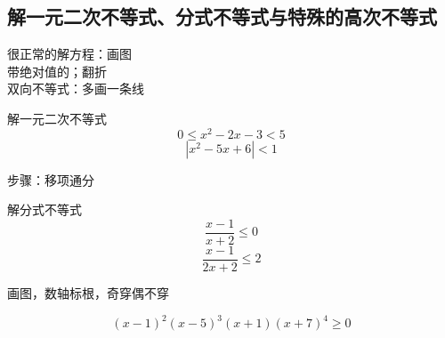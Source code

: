 \subsection{解一元二次不等式、分式不等式与特殊的高次不等式}
很正常的解方程：画图
\\带绝对值的；翻折
\\双向不等式：多画一条线
\begin{example}解一元二次不等式
    \[0 \leq x^2-2x-3<5\]
\[|x^2-5x+6|<1\]
\end{example}


步骤：移项通分
\begin{example}解分式不等式
    \[\frac{x-1}{x+2} \leq 0\]
\[\frac{x-1}{2x+2} \leq 2\]
\end{example}


画图，数轴标根，奇穿偶不穿
\begin{example}
    \[(x-1)^2(x-5)^3(x+1)(x+7)^4 \geq 0\]
\end{example}



\clearpage

